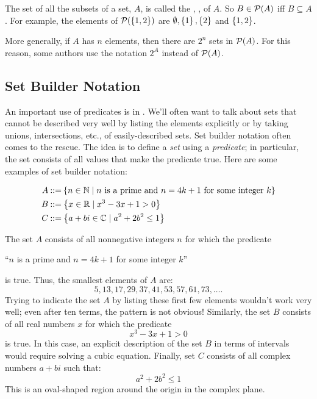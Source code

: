 The set of all the subsets of a set, $A$, is called the , , of $A$.  So $B \in \mathcal{P}(A)$ iff $B
\subseteq A$.  For example, the elements of $\mathcal{P}(\left\{1, 2\right\})$ are
$\emptyset, \left\{1\right\}, \left\{2\right\}$ and $\left\{1, 2\right\}$.

More generally, if $A$ has $n$ elements, then there are $2^n$ sets in
$\mathcal{P}(A)$.  For this reason, some authors use the notation $2^A$ instead
of $\mathcal{P}(A)$.

\subsection{Set Builder Notation}

An important use of predicates is in .  We'll
often want to talk about sets that cannot be described very well by
listing the elements explicitly or by taking unions, intersections,
etc., of easily-described sets.  Set builder notation often comes to the
rescue.  The idea is to define a \textit{set} using a \textit{predicate};
in particular, the set consists of all values that make the predicate
true.  Here are some examples of set builder notation:

\begin{align*}
A & \mathbin{::=} \left\{n \in \mathbb{N} \mid \text{$n$ is a prime and $n =
    4k+1$ for some integer $k$}\right\} \\
B & \mathbin{::=} \left\{x \in \mathbb{R} \mid x^3 - 3 x + 1 > 0\right\} \\
C & \mathbin{::=} \left\{a + b i \in \mathbb{C} \mid a^2 + 2 b^2 \leq 1\right\}
\end{align*}

The set $A$ consists of all nonnegative integers $n$ for which the
predicate
\begin{center}
``$n$ is a prime and $n = 4k+1$ for some integer $k$''
\end{center}
is true.  Thus, the smallest elements of $A$ are:
\[
5, 13, 17, 29, 37, 41, 53, 57, 61, 73, \ldots.
\]
Trying to indicate the set $A$ by listing these first few elements
wouldn't work very well; even after ten terms, the pattern is not
obvious!  Similarly, the set $B$ consists of all real numbers $x$ for
which the predicate
\[
x^3 - 3x + 1 > 0
\]
is true.  In this case, an explicit description of the set $B$ in
terms of intervals would require solving a cubic equation.  Finally,
set $C$ consists of all complex numbers $a + b i$ such that:
\[
a^2 + 2 b^2 \leq 1
\]
This is an oval-shaped region around the origin in the complex plane.

